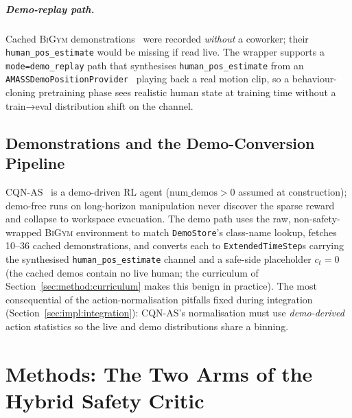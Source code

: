 \documentclass[11pt,a4paper]{report}
\newcommand{\bigym}{\textsc{BiGym}}
\newcommand{\cqnas}{CQN-AS}
\begin{document}
\paragraph{Demo-replay path.}
Cached \bigym{} demonstrations~\cite{chernyadev2024bigym} were
recorded \emph{without} a coworker; their
\texttt{human\_pos\_estimate} would be missing if read live. The
wrapper supports a \texttt{mode=demo\_replay} path that synthesises
\texttt{human\_pos\_estimate} from an
\texttt{AMASSDemoPositionProvider}~\cite{mahmood2019amass} playing
back a real motion clip, so a behaviour-cloning pretraining phase
sees realistic human state at training time without a train→eval
distribution shift on the channel.

\section{Demonstrations and the Demo-Conversion Pipeline}
\label{sec:bench:demos}

\cqnas{}~\cite{seo2024cqnas} is a demo-driven RL agent
($\text{num\_demos} > 0$ assumed at construction); demo-free runs on
long-horizon manipulation never discover the sparse reward and
collapse to workspace evacuation. The demo path uses the raw,
non-safety-wrapped \bigym{} environment to match
\texttt{DemoStore}'s class-name lookup, fetches 10--36 cached
demonstrations, and converts each to \texttt{ExtendedTimeStep}s
carrying the synthesised \texttt{human\_pos\_estimate} channel and a
safe-side placeholder $c_t = 0$ (the cached demos contain no live
human; the curriculum of Section~\ref{sec:method:curriculum} makes
this benign in practice). The most consequential of the
action-normalisation pitfalls fixed during integration
(Section~\ref{sec:impl:integration}): \cqnas{}'s normalisation must
use \emph{demo-derived} action statistics so the live and demo
distributions share a binning.

\chapter{Methods: The Two Arms of the Hybrid Safety Critic}
\label{ch:method}
\end{document}
